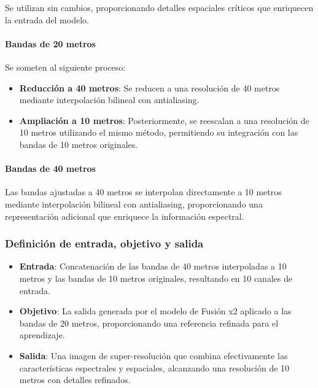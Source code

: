                 Se utilizan sin cambios, proporcionando detalles espaciales críticos que enriquecen la entrada del modelo.

            \paragraph{Bandas de 20 metros}

                Se someten al siguiente proceso:

                \begin{itemize}
                    \item \textbf{Reducción a 40 metros}: Se reducen a una resolución de 40 metros mediante interpolación bilineal con antialiasing.
                    \item \textbf{Ampliación a 10 metros}: Posteriormente, se reescalan a una resolución de 10 metros utilizando el mismo método, permitiendo su integración con las bandas de 10 metros originales.
                \end{itemize}

            \paragraph{Bandas de 40 metros}

                Las bandas ajustadas a 40 metros se interpolan directamente a 10 metros mediante interpolación bilineal con antialiasing, proporcionando una representación adicional que enriquece la información espectral.

        \subsubsection{Definición de entrada, objetivo y salida}

            \begin{itemize}
                \item \textbf{Entrada}: Concatenación de las bandas de 40 metros interpoladas a 10 metros y las bandas de 10 metros originales, resultando en 10 canales de entrada.
                \item \textbf{Objetivo}: La salida generada por el modelo de Fusión x2 aplicado a las bandas de 20 metros, proporcionando una referencia refinada para el aprendizaje.
                \item \textbf{Salida}: Una imagen de super-resolución que combina efectivamente las características espectrales y espaciales, alcanzando una resolución de 10 metros con detalles refinados.
            \end{itemize}

